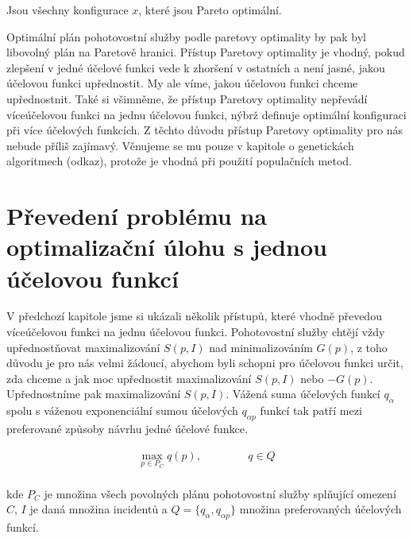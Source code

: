 \begin{definice}
  Jsou všechny konfigurace $x$, které jsou Pareto optimální.
  \\
\end{definice}

Optimální plán pohotovostní služby podle paretovy optimality by pak byl libovolný plán na Paretově hranici.
Přístup Paretovy optimality je vhodný, pokud zlepšení v jedné účelové funkci vede k zhoršení v ostatních a není jasné, jakou účelovou funkci upřednostit.
My ale víme, jakou účelovou funkci chceme upřednostnit.
Také si všimněme, že přístup Paretovy optimality nepřevádí víceúčelovou funkci na jednu účelovou funkci,
nýbrž definuje optimální konfiguraci při více účelových funkcích. 
Z těchto důvodu přístup Paretovy optimality pro nás nebude příliš zajímavý.
Věnujeme se mu pouze v kapitole o genetickách algoritmech (odkaz), protože je vhodná při použití populačních metod.

\section{Převedení problému na optimalizační úlohu s jednou účelovou funkcí}

V předchozí kapitole jsme si ukázali několik přístupů, které vhodně převedou víceúčelovou funkci na jednu účelovou funkci.
Pohotovostní služby chtějí vždy upřednostňovat maximalizování $S(p, I)$ nad minimalizováním $G(p)$,
z toho důvodu je pro nás velmi žádoucí, abychom byli schopni pro účelovou funkci určit, zda chceme a jak moc upřednostit maximalizování $S(p, I)$ nebo $-G(p)$.
Upřednostníme pak maximalizování $S(p, I)$.
Vážená suma účelových funkcí $q_{\alpha}$ spolu s váženou exponenciální sumou účelových $q_{\alpha p}$ funkcí tak patří mezi preferované způsoby návrhu jedné účelové funkce.

\begin{definice}
  \begin{align}
    \max_{p \in P_C} q(p), \hspace{50pt} q \in Q 
  \end{align}
  \\
  kde $P_C$ je množina všech povolných plánu pohotovostní služby splňující omezení $C$, $I$ je daná množina incidentů a $Q = \{ q_{\alpha}, q_{\alpha p}\}$ množina preferovaných účelových funkcí.
\end{definice}

